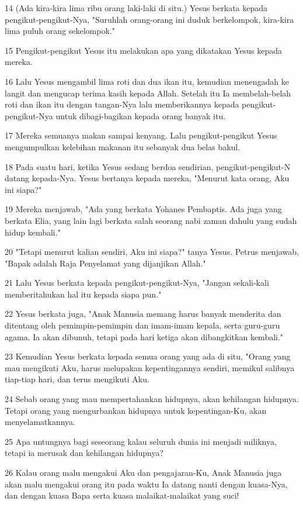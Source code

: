 \par 14 (Ada kira-kira lima ribu orang laki-laki di situ.) Yesus berkata kepada pengikut-pengikut-Nya, "Suruhlah orang-orang ini duduk berkelompok, kira-kira lima puluh orang sekelompok."
\par 15 Pengikut-pengikut Yesus itu melakukan apa yang dikatakan Yesus kepada mereka.
\par 16 Lalu Yesus mengambil lima roti dan dua ikan itu, kemudian menengadah ke langit dan mengucap terima kasih kepada Allah. Setelah itu Ia membelah-belah roti dan ikan itu dengan tangan-Nya lalu memberikannya kepada pengikut-pengikut-Nya untuk dibagi-bagikan kepada orang banyak itu.
\par 17 Mereka semuanya makan sampai kenyang. Lalu pengikut-pengikut Yesus mengumpulkan kelebihan makanan itu sebanyak dua belas bakul.
\par 18 Pada suatu hari, ketika Yesus sedang berdoa sendirian, pengikut-pengikut-N datang kepada-Nya. Yesus bertanya kepada mereka, "Menurut kata orang, Aku ini siapa?"
\par 19 Mereka menjawab, "Ada yang berkata Yohanes Pembaptis. Ada juga yang berkata Elia, yang lain lagi berkata salah seorang nabi zaman dahulu yang sudah hidup kembali."
\par 20 "Tetapi menurut kalian sendiri, Aku ini siapa?" tanya Yesus. Petrus menjawab, "Bapak adalah Raja Penyelamat yang dijanjikan Allah."
\par 21 Lalu Yesus berkata kepada pengikut-pengikut-Nya, "Jangan sekali-kali memberitahukan hal itu kepada siapa pun."
\par 22 Yesus berkata juga, "Anak Manusia memang harus banyak menderita dan ditentang oleh pemimpin-pemimpin dan imam-imam kepala, serta guru-guru agama. Ia akan dibunuh, tetapi pada hari ketiga akan dibangkitkan kembali."
\par 23 Kemudian Yesus berkata kepada semua orang yang ada di situ, "Orang yang mau mengikuti Aku, harus melupakan kepentingannya sendiri, memikul salibnya tiap-tiap hari, dan terus mengikuti Aku.
\par 24 Sebab orang yang mau mempertahankan hidupnya, akan kehilangan hidupnya. Tetapi orang yang mengurbankan hidupnya untuk kepentingan-Ku, akan menyelamatkannya.
\par 25 Apa untungnya bagi seseorang kalau seluruh dunia ini menjadi miliknya, tetapi ia merusak dan kehilangan hidupnya?
\par 26 Kalau orang malu mengakui Aku dan pengajaran-Ku, Anak Manusia juga akan malu mengakui orang itu pada waktu Ia datang nanti dengan kuasa-Nya, dan dengan kuasa Bapa serta kuasa malaikat-malaikat yang suci!

